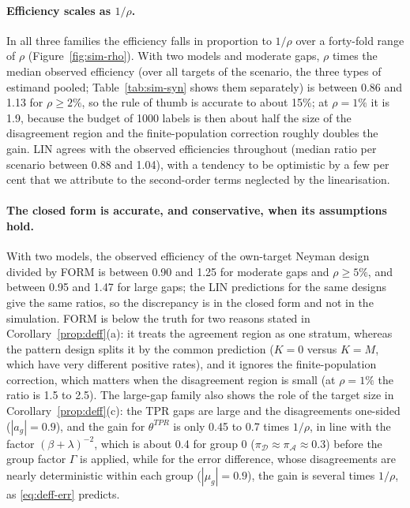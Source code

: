 \paragraph{Efficiency scales as $1/\rho$.} In all three families the efficiency falls in proportion
to $1/\rho$ over a forty-fold range of $\rho$ (Figure~\ref{fig:sim-rho}). With two models and
moderate gaps, $\rho$ times the median observed efficiency (over all targets of the scenario, the three types of estimand pooled; Table~\ref{tab:sim-syn} shows them separately) is between 0.86 and 1.13 for
$\rho\ge2\%$, so the rule of thumb is accurate to about 15\%; at $\rho=1\%$ it is 1.9, because the
budget of 1000 labels is then about half the size of the disagreement region and the
finite-population correction roughly doubles the gain. LIN agrees with the observed efficiencies
throughout (median ratio per scenario between 0.88 and 1.04), with a tendency to be optimistic by a
few per cent that we attribute to the second-order terms neglected by the linearisation.

\paragraph{The closed form is accurate, and conservative, when its assumptions hold.} With two
models, the observed efficiency of the own-target Neyman design divided by FORM is between 0.90 and
1.25 for moderate gaps and $\rho\ge5\%$, and between 0.95 and 1.47 for large gaps; the LIN
predictions for the same designs give the same ratios, so the discrepancy is in the closed form and
not in the simulation. FORM is below the truth for two reasons stated in
Corollary~\ref{prop:deff}(a): it treats the agreement region as one stratum, whereas the pattern
design splits it by the common prediction ($K=0$ versus $K=M$, which have very different positive
rates), and it ignores the finite-population correction, which matters when the disagreement region
is small (at $\rho=1\%$ the ratio is 1.5 to 2.5). The large-gap family also shows the role of the
target size in Corollary~\ref{prop:deff}(c): the TPR gaps are large and the disagreements one-sided
($|a_g|=0.9$), and the gain for $\theta^{TPR}$ is only 0.45 to 0.7 times $1/\rho$, in line with
the factor $(\beta+\lambda)^{-2}$, which is about 0.4 for group 0 ($\pi_{\mathcal D}\approx
\pi_{\mathcal A}\approx0.3$) before the group factor $\Gamma$ is applied, while for the error difference, whose disagreements are nearly
deterministic within each group ($|\mu_g|=0.9$), the gain is several times $1/\rho$, as
\eqref{eq:deff-err} predicts.

